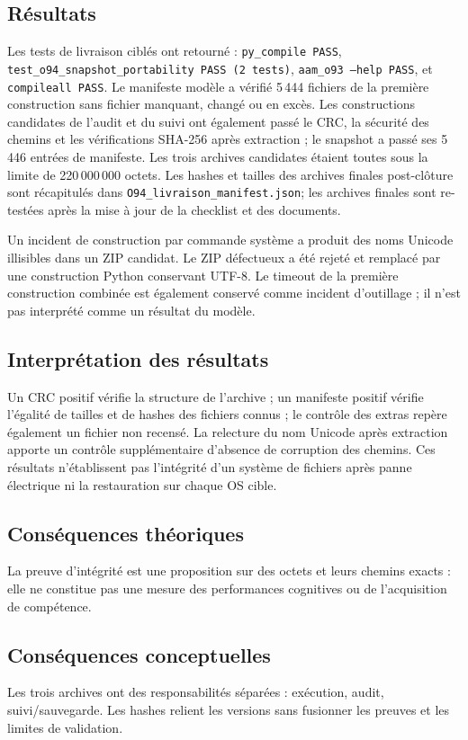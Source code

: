 \documentclass[11pt,a4paper]{article}
\begin{document}
\subsection{Résultats}
Les tests de livraison ciblés ont retourné : \texttt{py\_compile PASS}, \texttt{test\_o94\_snapshot\_portability PASS (2 tests)}, \texttt{aam\_o93 --help PASS}, et \texttt{compileall PASS}. Le manifeste modèle a vérifié 5\,444 fichiers de la première construction sans fichier manquant, changé ou en excès. Les constructions candidates de l'audit et du suivi ont également passé le CRC, la sécurité des chemins et les vérifications SHA-256 après extraction ; le snapshot a passé ses 5\,446 entrées de manifeste. Les trois archives candidates étaient toutes sous la limite de 220\,000\,000 octets. Les hashes et tailles des archives finales post-clôture sont récapitulés dans \texttt{O94\_livraison\_manifest.json}; les archives finales sont re-testées après la mise à jour de la checklist et des documents.

Un incident de construction par commande système a produit des noms Unicode illisibles dans un ZIP candidat. Le ZIP défectueux a été rejeté et remplacé par une construction Python conservant UTF-8. Le timeout de la première construction combinée est également conservé comme incident d'outillage ; il n'est pas interprété comme un résultat du modèle.

\subsection{Interprétation des résultats}
Un CRC positif vérifie la structure de l'archive ; un manifeste positif vérifie l'égalité de tailles et de hashes des fichiers connus ; le contrôle des extras repère également un fichier non recensé. La relecture du nom Unicode après extraction apporte un contrôle supplémentaire d'absence de corruption des chemins. Ces résultats n'établissent pas l'intégrité d'un système de fichiers après panne électrique ni la restauration sur chaque OS cible.

\subsection{Conséquences théoriques}
La preuve d'intégrité est une proposition sur des octets et leurs chemins exacts : elle ne constitue pas une mesure des performances cognitives ou de l'acquisition de compétence.

\subsection{Conséquences conceptuelles}
Les trois archives ont des responsabilités séparées : exécution, audit, suivi/sauvegarde. Les hashes relient les versions sans fusionner les preuves et les limites de validation.
\end{document}
